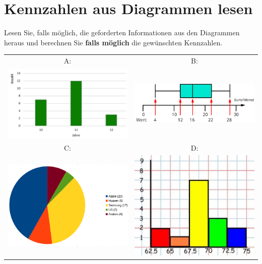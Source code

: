 


\renewcommand{\metaHeaderLine}{Arbeitsblatt}
\renewcommand{\arbeitsblattTitel}{Diagramme Lesen (V 0.1)}





\arbeitsblattHeader{}

\section{Kennzahlen aus Diagrammen lesen}
Lesen Sie, falls möglich, die geforderten Informationen aus den
Diagrammen heraus und berechnen Sie \textbf{falls möglich} die gewünschten Kennzahlen.

\begin{tabular}{c|c}
A: & B: \\
\includegraphics[width=70mm]{img/Grafik_A_Saeulendiagramm.png} &
\includegraphics[width=70mm]{img/Grafik_B_Boxplot}\\
\hline
C: & D: \\
\includegraphics[width=70mm]{img/Grafik_C_Kreisdiagramm.png} &
\includegraphics[width=70mm]{img/Grafik_D_Histogramm.png}
\end{tabular}



